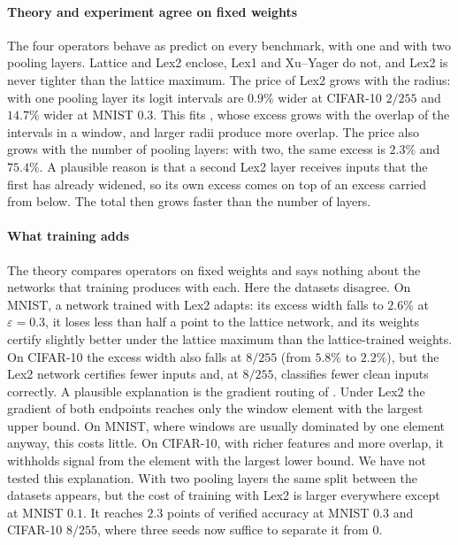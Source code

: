 \documentclass[preprint,12pt]{elsarticle}
\theoremstyle{definition}
\newcommand{\eps}{\varepsilon}
\begin{document}
\paragraph{Theory and experiment agree on fixed weights} The four operators behave as  predict on every benchmark, with one and with two pooling layers. Lattice and Lex2 enclose, Lex1 and Xu--Yager do not, and Lex2 is never tighter than the lattice maximum. The price of Lex2 grows with the radius: with one pooling layer its logit intervals are $0.9\%$ wider at CIFAR-10 $2/255$ and $14.7\%$ wider at MNIST $0.3$. This fits , whose excess grows with the overlap of the intervals in a window, and larger radii produce more overlap. The price also grows with the number of pooling layers: with two, the same excess is $2.3\%$ and $75.4\%$. A plausible reason is that a second Lex2 layer receives inputs that the first has already widened, so its own excess comes on top of an excess carried from below. The total then grows faster than the number of layers.

\paragraph{What training adds} The theory compares operators on fixed weights and says nothing about the networks that training produces with each. Here the datasets disagree. On MNIST, a network trained with Lex2 adapts: its excess width falls to $2.6\%$ at $\eps=0.3$, it loses less than half a point to the lattice network, and its weights certify slightly better under the lattice maximum than the lattice-trained weights. On CIFAR-10 the excess width also falls at $8/255$ (from $5.8\%$ to $2.2\%$), but the Lex2 network certifies fewer inputs and, at $8/255$, classifies fewer clean inputs correctly. A plausible explanation is the gradient routing of . Under Lex2 the gradient of both endpoints reaches only the window element with the largest upper bound. On MNIST, where windows are usually dominated by one element anyway, this costs little. On CIFAR-10, with richer features and more overlap, it withholds signal from the element with the largest lower bound. We have not tested this explanation. With two pooling layers the same split between the datasets appears, but the cost of training with Lex2 is larger everywhere except at MNIST $0.1$. It reaches $2.3$ points of verified accuracy at MNIST $0.3$ and CIFAR-10 $8/255$, where three seeds now suffice to separate it from $0$.
\end{document}
